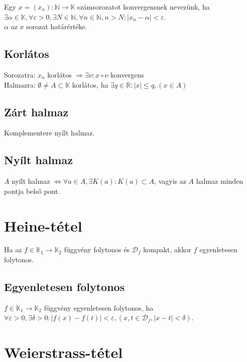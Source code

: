\documentclass[margin=0px]{article}
\begin{document}
	Egy $x = (x_{n}) : \mathbb{N} \to \mathbb{K}$ számsorozatot konvergensnek nevezünk, ha $\exists \alpha \in \mathbb{K}, \forall \varepsilon > 0, \exists N \in \mathbb{N}, \forall n \in \mathbb{N}, n > N : |x_{n}-\alpha| < \varepsilon$. \\
	$\alpha$ az $x$ sorozat határértéke.
	
	\subsection{Korlátos}
	
	Sorozatra: $x_{n}$ korlátos $\Rightarrow \exists \nu : x \circ \nu$ konvergens \\
	Halmazra: $\emptyset \neq A \subset \mathbb{K}$ korlátos, ha $\exists q \in \mathbb{R} : |x| \leq q, (x \in A)$
	
	\subsection{Zárt halmaz}
	
	Komplementere nyílt halmaz.
	
	\subsection{Nyílt halmaz}
	
	$A$ nyílt halmaz $\iff \forall a \in A, \exists K(a): K(a) \subset A$, vagyis az $A$ halmaz minden pontja belső pont.
	
	\section{Heine-tétel}
	
	Ha az $f \in \mathbb{K}_{1} \to \mathbb{K}_{2}$ függvény folytonos és $\mathcal{D}_{f}$ kompakt, akkor $f$ egyenletesen folytonos.
	
	\subsection{Egyenletesen folytonos}
	
	$f \in \mathbb{K}_{1} \to \mathbb{K}_{2}$ függvény egyenletesen folytonos, ha $\forall \varepsilon > 0, \exists \delta > 0 : |f(x)-f(t)| < \varepsilon, (x,t \in \mathcal{D}_{f}, |x-t| < \delta)$.
	
	\section{Weierstrass-tétel}
	
\end{document}
